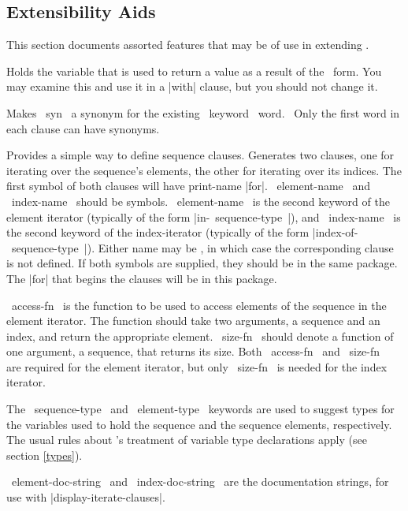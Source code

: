 \subsection{Extensibility Aids}
\label{aids}

This section documents assorted features that may be of use in
extending \iter.

\begin{clauses}

Holds the variable that is used to return a value as a result of the
\iter\ form.  You may examine this and use it in a |with| clause, but
you should not change it.

 Makes ~syn~ a synonym for the existing \iter\ keyword ~word.~  Only
the first word in each clause can have synonyms. 

Provides
a simple way to define sequence clauses.  Generates two
clauses, one for iterating over the sequence's elements, the other
for iterating over its indices.  The first symbol of both
clauses will have print-name |for|.
~element-name~  and ~index-name~ should be symbols.
~element-name~ is the second keyword of the element iterator (typically of
the form 
|in-~sequence-type~|), and ~index-name~ is the second keyword
of the index-iterator (typically of the form
|index-of-~sequence-type~|).  Either name may be 
\nil, in which case the corresponding clause is not defined.  If both
symbols are supplied, they should be in the same package.  The |for|
that begins the clauses will be in this package.

\cpar ~access-fn~ is the function to be used to
access elements of the sequence in the element iterator.  The function
should take two 
arguments, a sequence and an index, and return the appropriate element.
~size-fn~ should denote a function of one argument, a sequence, that
returns its size.  Both ~access-fn~ and ~size-fn~ are required for the
element iterator, but only ~size-fn~ is needed for the index iterator.

\cpar The ~sequence-type~ and ~element-type~ keywords are used to
suggest types for the variables 
used to hold the sequence and the
sequence elements, respectively.  The usual rules about \iter's
treatment of variable type declarations apply (see section \ref{types}).

\cpar ~element-doc-string~ and ~index-doc-string~ are
the documentation strings, for use with |display-iterate-clauses|. 


\end{clauses}
